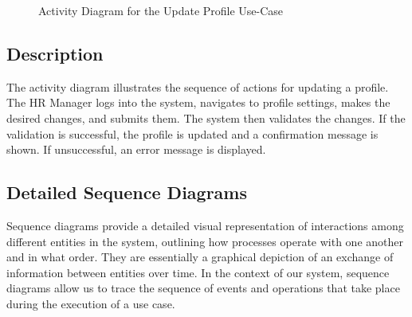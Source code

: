 \begin{figure}[H]
    \centering
    \caption{ Activity Diagram for the Update Profile Use-Case }
    \label{fig:UseCase3_Activity_Diagram}
\end{figure}

\subsection*{Description}
The activity diagram illustrates the sequence of actions for updating a profile. The HR Manager logs into the system, navigates to profile settings, makes the desired changes, and submits them. The system then validates the changes. If the validation is successful, the profile is updated and a confirmation message is shown. If unsuccessful, an error message is displayed.

\subsection{Detailed Sequence Diagrams}
Sequence diagrams provide a detailed visual representation of interactions among different entities in the system, outlining how processes operate with one another and in what order. They are essentially a graphical depiction of an exchange of information between entities over time. In the context of our system, sequence diagrams allow us to trace the sequence of events and operations that take place during the execution of a use case.

